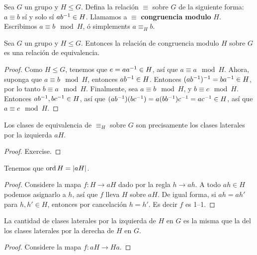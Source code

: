 \begin{definition}
    Sea $G$ un grupo y $H \leq G$. Defina la relaci\'on $\equiv$ sobre $G$ de la
    siguiente forma:  $a \equiv b$ s\'i y solo s\'i $ab^{-1} \in H$. Llamamos a
    $\equiv$  \textbf{congruencia modulo} $H$. Escribimos $a \equiv b \mod{H}$, \'o
    simplements $a \equiv_H b$.
\end{definition}

\begin{lemma}\label{lemma_3.6}
    Sea $G$ un grupo y  $H \leq G$. Entonces la relaci\'on de congruencia modulo
    $H$ sobre  $G$ es una relaci\'on de equivalencia.
\end{lemma}
\begin{proof}
    Como $H \leq G$, tenemos que  $e=aa^{-1} \in H$, as\'i que $a \equiv a
    \mod{H}$. Ahora, suponga que $a \equiv b \mod{H}$, entonces $ab^{-1} \in
    H$. Entonces $(ab^{-1})^{-1}=ba^{-1} \in H$, por lo tanto $b \equiv a
    \mod{H}$. Finalmente, sea $a \equiv b \mod{H}$, y $b \equiv c \mod{H}$.
    Entonces $ab^{-1},bc^{-1} \in H$, as\'i que
    $(ab^{-1})(bc^{-1})=a(bb^{-1})c^{-1}=ac^{-1} \in H$, as\'i que $a
    \equiv c \mod{H}$.
\end{proof}
\begin{corollary}
    Los clases de equivalencia de $\equiv_H$ sobre  $G$ son precisamente los
    clases laterales por la izquierda  $aH$.
\end{corollary}
\begin{proof}
    Exercise.
\end{proof}
\begin{corollary}
    Tenemos que $\operatorname{ord}{H}=|aH|$.
\end{corollary}
\begin{proof}
    Considere la mapa $f:H \xrightarrow{} aH$ dado por la regla $h
    \xrightarrow{} ah$. A todo $ah \in H$ podemos asignarlo a  $h$, as\'i que
    $f$ lleva  $H$ sobre  $aH$. De igual forma, si $ah=ah'$ para  $h,h' \in H$,
    entonces por cancelaci\'on  $h=h'$. Es decir  $f$ es 1--1.
\end{proof}
\begin{corollary}
    La cantidad de clases laterales por la izquierda de $H$ en  $G$ es la misma
    que la del los clases laterales por la derecha de  $H$ en  $G$.
\end{corollary}
\begin{proof}
    Considere la mapa $f:aH \xrightarrow{} Ha$.
\end{proof}

